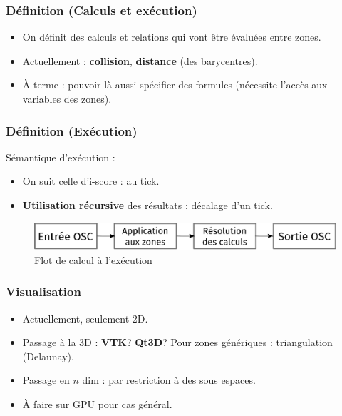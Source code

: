 \documentclass{beamer}
\begin{document}
\begin{frame}
    \frametitle{Définition (Calculs et exécution)}\Large
    \begin{itemize}
        \item On définit des calculs et relations qui vont être évaluées entre zones.
        \item Actuellement : \textbf{collision}, \textbf{distance} (des barycentres). 
        \item À terme : pouvoir là aussi spécifier des formules (nécessite l'accès aux variables des zones).
    \end{itemize}
\end{frame}

    \begin{frame}
        \frametitle{Définition (Exécution)}\Large
        \vspace{1em}
        Sémantique d'exécution : 
        \begin{itemize}
            \item On suit celle d'i-score : au tick.
            \item \textbf{Utilisation récursive} des résultats : décalage d'un tick.
        \end{itemize}
        
        \begin{figure}
            \includegraphics[width=\textwidth]{images/exec.eps}
            \caption{Flot de calcul à l'exécution}
        \end{figure}
    \end{frame}
    
\begin{frame}
    \frametitle{Visualisation}
    \Large
    \begin{itemize}
        \item Actuellement, seulement 2D.
        \item Passage à la 3D : \textbf{VTK}? \textbf{Qt3D}?
        Pour zones génériques : triangulation (Delaunay).
        \item Passage en $n$ dim : par restriction à des sous espaces.
        \item À faire sur GPU pour cas général.
    \end{itemize}
\end{frame}
\end{document}
